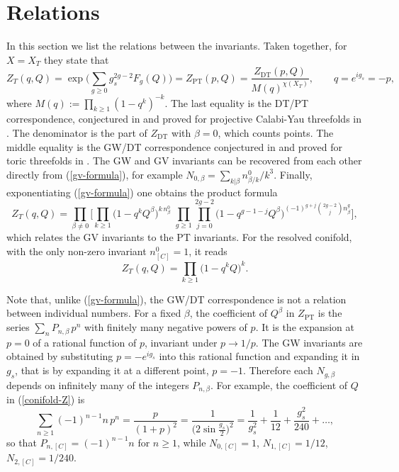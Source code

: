 \documentclass[11pt]{article}
\begin{document}
\section{Relations}\label{sec:relations}

In this section we list the relations between the invariants. Taken together, for $X=X_T$ they
state that
\begin{equation}\label{all-equal}
Z_T(q,Q)=\exp\Big(\sum_{g\geq0}g_s^{2g-2}F_g(Q)\Big)=Z_\text{PT}(p,Q)=
\frac{Z_\text{DT}(p,Q)}{M(q)^{\chi(X_T)}},\qquad q=e^{ig_s}=-p,
\end{equation}
where $M(q):=\prod_{k\geq1}(1-q^k)^{-k}$. The last equality is the DT/PT correspondence,
conjectured in \cite{MNOP,PT} and proved for projective Calabi-Yau threefolds in
\cite{Bridgeland-hall}. The denominator is the part of $Z_\text{DT}$ with $\beta=0$, which counts
points. The middle equality is the GW/DT correspondence conjectured in \cite{MNOP} and proved
for toric threefolds in \cite{MOOP}. The GW and GV invariants can be recovered from each other
directly from (\ref{gv-formula}), for example $N_{0,\beta}=\sum_{k|\beta}n^0_{\beta/k}/k^3$.
Finally, exponentiating (\ref{gv-formula}) one obtains the product formula
\begin{equation}\label{gv-product}
Z_T(q,Q)=\prod_{\beta\neq0}\Big[\prod_{k\geq1}\big(1-q^kQ^\beta\big)^{k\,n^0_\beta}\;
\prod_{g\geq1}\prod_{j=0}^{2g-2}\big(1-q^{g-1-j}Q^\beta\big)^{(-1)^{g+j}\binom{2g-2}{j}n^g_\beta}\Big],
\end{equation}
which relates the GV invariants to the PT invariants. For the resolved conifold, with the only
non-zero invariant $n^0_{[C]}=1$, it reads
\begin{equation}\label{conifold-Z}
Z_T(q,Q)=\prod_{k\geq1}\big(1-q^kQ\big)^k .
\end{equation}

Note that, unlike (\ref{gv-formula}), the GW/DT correspondence is not a relation between
individual numbers. For a fixed $\beta$, the coefficient of $Q^\beta$ in $Z_\text{PT}$ is the series
$\sum_nP_{n,\beta}\,p^n$ with finitely many negative powers of $p$. It is the expansion at $p=0$ of
a rational function of $p$, invariant under $p\rightarrow1/p$. The GW invariants are obtained by
substituting $p=-e^{ig_s}$ into this rational function and expanding it in $g_s$, that is by
expanding it at a different point, $p=-1$. Therefore each $N_{g,\beta}$ depends on infinitely
many of the integers $P_{n,\beta}$. For example, the coefficient of $Q$ in (\ref{conifold-Z}) is
\begin{equation}\label{conifold-gw-pt}
\sum_{n\geq1}(-1)^{n-1}n\,p^n=\frac{p}{(1+p)^2}=\frac{1}{\big(2\sin\frac{g_s}{2}\big)^2}=
\frac{1}{g_s^2}+\frac{1}{12}+\frac{g_s^2}{240}+\ldots,
\end{equation}
so that $P_{n,[C]}=(-1)^{n-1}n$ for $n\geq1$, while $N_{0,[C]}=1$, $N_{1,[C]}=1/12$,
$N_{2,[C]}=1/240$.
\end{document}
